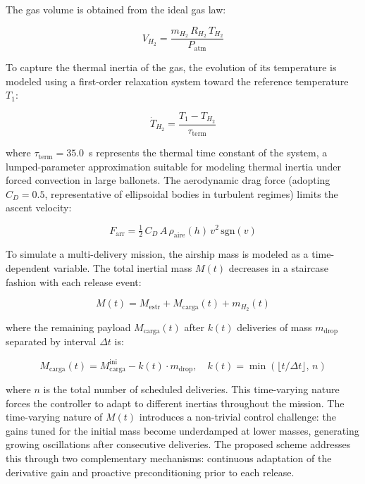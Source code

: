 \documentclass[aerospace,article,submit,pdftex,moreauthors]{Definitions/mdpi}
\begin{document}
The gas volume is obtained from the ideal gas law:

\begin{equation}
V_{H_2} = \frac{m_{H_2}\,R_{H_2}\,T_{H_2}}{P_\text{atm}}
\label{eq:gas_ideal}
\end{equation}

To capture the thermal inertia of the gas, the evolution of its temperature is modeled using a first-order relaxation system toward the reference temperature $T_1$:

\begin{equation}
\dot{T}_{H_2} = \frac{T_1 - T_{H_2}}{\tau_\text{term}}
\end{equation}

where $\tau_\text{term} = 35.0$~s represents the thermal time constant of the system, a lumped-parameter approximation suitable for modeling thermal inertia under forced convection in large ballonets. The aerodynamic drag force (adopting $C_D = 0.5$, representative of ellipsoidal bodies in turbulent regimes) limits the ascent velocity:

\begin{equation}
F_\text{arr} = \tfrac{1}{2}\,C_D\,A\,\rho_\text{aire}(h)\,v^2\,\mathrm{sgn}(v)
\label{eq:arrastre}
\end{equation}

To simulate a multi-delivery mission, the airship mass is modeled as a time-dependent variable. The total inertial mass $M(t)$ decreases in a staircase fashion with each release event:

\begin{equation}
M(t) = M_\text{estr} + M_\text{carga}(t) + m_{H_2}(t)
\end{equation}

where the remaining payload $M_\text{carga}(t)$ after $k(t)$ deliveries of mass $m_\text{drop}$ separated by interval $\Delta t$ is:

\begin{equation}
M_\text{carga}(t) = M_\text{carga}^\text{ini} - k(t) \cdot m_\text{drop}, \quad k(t) = \min\left(\lfloor t / \Delta t \rfloor,\, n\right)
\end{equation}

where $n$ is the total number of scheduled deliveries. This time-varying nature forces the controller to adapt to different inertias throughout the mission. The time-varying nature of $M(t)$ introduces a non-trivial control challenge: the gains tuned for the initial mass become underdamped at lower masses, generating growing oscillations after consecutive deliveries. The proposed scheme addresses this through two complementary mechanisms: continuous adaptation of the derivative gain and proactive preconditioning prior to each release.
\end{document}
